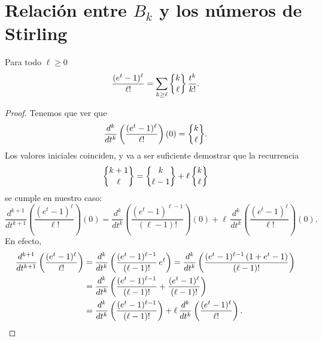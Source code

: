 \documentclass{article}
\numberwithin{equation}{section}
\theoremstyle{definition}
\begin{document}
\pagebreak


\section{Relación entre $B_k$ y los números de Stirling}

\begin{lema}
  \label{exp-stirling}
  Para todo $\ell \ge 0$
  $$\frac{(e^t - 1)^\ell}{\ell!} = \sum_{k \ge \ell} \Stirling{k}{\ell}\,\frac{t^k}{k!}.$$

  \begin{proof}
    Tenemos que ver que
    $$\frac{d^k}{dt^k} \left(\frac{(e^t - 1)^\ell}{\ell!}\right) (0) = \Stirling{k}{\ell}.$$
    Los valores iniciales coinciden, y va a ser suficiente demostrar que la
    recurrencia
    $$\Stirling{k+1}{\ell} = \Stirling{k}{\ell-1} + \ell \, \Stirling{k}{\ell}$$
    se cumple en nuestro caso:
    \[ \frac{d^{k+1}}{dt^{k+1}} \left(\frac{(e^t - 1)^\ell}{\ell!}\right) (0) =
      \frac{d^k}{dt^k} \left(\frac{(e^t - 1)^{\ell-1}}{(\ell-1)!}\right) (0) +
      \ell\,\frac{d^k}{dt^k} \left(\frac{(e^t - 1)^\ell}{\ell!}\right) (0). \]
    En efecto,
    \begin{align*}
      \frac{d^{k+1}}{dt^{k+1}} \left(\frac{(e^t - 1)^\ell}{\ell!}\right) & =
                                                                           \frac{d^k}{dt^k} \left(\frac{(e^t - 1)^{\ell-1}}{(\ell-1)!}\,e^t\right) =
                                                                           \frac{d^k}{dt^k} \left(\frac{(e^t - 1)^{\ell-1} \, (1 + e^t - 1)}{(\ell - 1)!}\right) \\
                                                                         & =
                                                                           \frac{d^k}{dt^k} \left(\frac{(e^t - 1)^{\ell-1}}{(\ell-1)!} +
                                                                           \frac{(e^t-1)^\ell}{(\ell-1)!}\right) \\
                                                                         & =
                                                                           \frac{d^k}{dt^k} \left(\frac{(e^t - 1)^{\ell-1}}{(\ell-1)!}\right) +
                                                                           \ell\,\frac{d^k}{dt^k} \left(\frac{(e^t-1)^\ell}{\ell!}\right).
                                                                           \qedhere
    \end{align*}
  \end{proof}
\end{lema}
\end{document}
